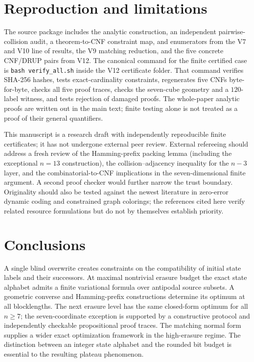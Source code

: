 \documentclass[11pt,a4paper]{article}
\begin{document}
\section{Reproduction and limitations}\label{sec:reproduction}
The source package includes the analytic construction, an independent pairwise-collision audit, a theorem-to-CNF constraint map, and enumerators from the V7 and V10 line of results, the V9 matching reduction, and the five concrete CNF/DRUP pairs from V12. The canonical command for the finite certified case is \texttt{bash verify\_all.sh} inside the V12 certificate folder. That command verifies SHA-256 hashes, tests exact-cardinality constraints, regenerates five CNFs byte-for-byte, checks all five proof traces, checks the seven-cube geometry and a $120$-label witness, and tests rejection of damaged proofs. The whole-paper analytic proofs are written out in the main text; finite testing alone is not treated as a proof of their general quantifiers.

This manuscript is a research draft with independently reproducible finite certificates; it has not undergone external peer review. External refereeing should address a fresh review of the Hamming-prefix packing lemma (including the exceptional $n=13$ construction), the collision--adjacency inequality for the $n-3$ layer, and the combinatorial-to-CNF implications in the seven-dimensional finite argument. A second proof checker would further narrow the trust boundary. Originality should also be tested against the newest literature in zero-error dynamic coding and constrained graph colorings; the references cited here verify related resource formulations but do not by themselves establish priority.

\section{Conclusions}
A single blind overwrite creates constraints on the compatibility of initial state labels and their successors. At maximal nontrivial erasure budget the exact state alphabet admits a finite variational formula over antipodal source subsets. A geometric converse and Hamming-prefix constructions determine its optimum at all blocklengths. The next erasure level has the same closed-form optimum for all $n\ge7$; the seven-coordinate exception is supported by a constructive protocol and independently checkable propositional proof traces. The matching normal form supplies a wider exact optimization framework in the high-erasure regime. The distinction between an integer state alphabet and the rounded bit budget is essential to the resulting plateau phenomenon.
\end{document}

